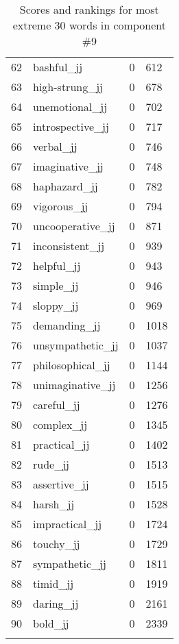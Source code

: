 \begin{longtable}[!htbp]{| rlr@{.}l |}
    62 & bashful\_jj & 0 & 612 \\
    63 & high-strung\_jj & 0 & 678 \\
    64 & unemotional\_jj & 0 & 702 \\
    65 & introspective\_jj & 0 & 717 \\
    66 & verbal\_jj & 0 & 746 \\
    67 & imaginative\_jj & 0 & 748 \\
    68 & haphazard\_jj & 0 & 782 \\
    69 & vigorous\_jj & 0 & 794 \\
    70 & uncooperative\_jj & 0 & 871 \\
    71 & inconsistent\_jj & 0 & 939 \\
    72 & helpful\_jj & 0 & 943 \\
    73 & simple\_jj & 0 & 946 \\
    74 & sloppy\_jj & 0 & 969 \\
    75 & demanding\_jj & 0 & 1018 \\
    76 & unsympathetic\_jj & 0 & 1037 \\
    77 & philosophical\_jj & 0 & 1144 \\
    78 & unimaginative\_jj & 0 & 1256 \\
    79 & careful\_jj & 0 & 1276 \\
    80 & complex\_jj & 0 & 1345 \\
    81 & practical\_jj & 0 & 1402 \\
    82 & rude\_jj & 0 & 1513 \\
    83 & assertive\_jj & 0 & 1515 \\
    84 & harsh\_jj & 0 & 1528 \\
    85 & impractical\_jj & 0 & 1724 \\
    86 & touchy\_jj & 0 & 1729 \\
    87 & sympathetic\_jj & 0 & 1811 \\
    88 & timid\_jj & 0 & 1919 \\
    89 & daring\_jj & 0 & 2161 \\
    90 & bold\_jj & 0 & 2339 \\
    \hline
    \caption{Scores and rankings for most extreme 30 words in component \#9} \\
\end{longtable}
